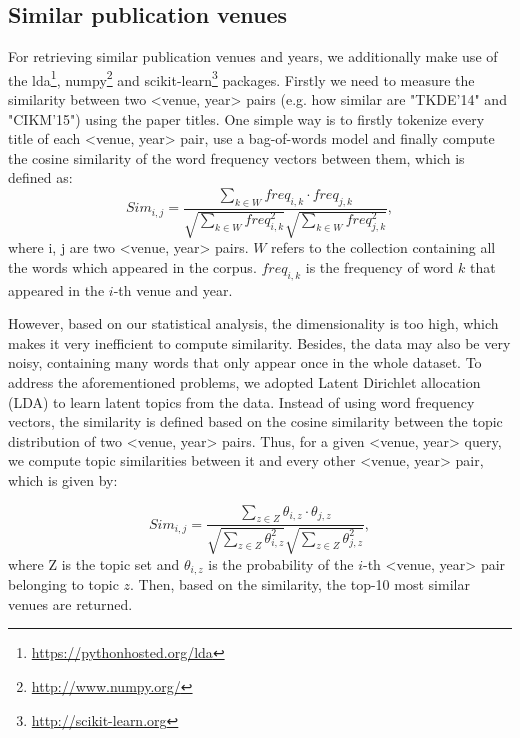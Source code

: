 \documentclass{sig-alternate-05-2015}
\begin{document}
\subsection{Similar publication venues}
For retrieving similar publication venues and years, we additionally make use of the lda\footnote{\url{https://pythonhosted.org/lda}}, numpy\footnote{\url{http://www.numpy.org/}} and scikit-learn\footnote{\url{http://scikit-learn.org}} packages. Firstly we need to measure the similarity between two <venue, year> pairs (e.g. how similar are "TKDE'14" and "CIKM'15") using the paper titles. One simple way is to firstly tokenize every title of each <venue, year> pair, use a bag-of-words model and finally compute the cosine similarity of the word frequency vectors between them, which is defined as:
\begin{equation*}
  Sim_{i, j} = \frac{\sum_{k\in W}freq_{i,k} \cdot freq_{j,k}}{\sqrt{\sum_{k\in W}freq_{i,k}^2}\sqrt{\sum_{k\in W}freq_{j,k}^2}},
\end{equation*}
where i, j are two <venue, year> pairs. $W$ refers to the collection containing all the words which appeared in the corpus. $freq_{i,k}$ is the frequency of word $k$ that appeared in the $i$-th venue and year.

However, based on our statistical analysis, the dimensionality is too high, which makes it very inefficient to compute similarity. Besides, the data may also be very noisy, containing many words that only appear once in the whole dataset. To address the aforementioned problems, we adopted Latent Dirichlet allocation (LDA)\cite{blei2003latent} to learn latent topics from the data. Instead of using word frequency vectors, the similarity is defined based on the cosine similarity between the topic distribution of two <venue, year> pairs. Thus, for a given <venue, year> query, we compute topic similarities between it and every other <venue, year> pair, which is given by:

\begin{equation*}
  Sim_{i, j} = \frac{\sum_{z\in Z}\theta_{i,z} \cdot \theta_{j,z}}{\sqrt{\sum_{z\in Z}\theta_{i,z}^2}\sqrt{\sum_{z\in Z}\theta_{j,z}^2}},
\end{equation*}
where Z is the topic set and $\theta_{i,z}$ is the probability of the $i$-th <venue, year> pair belonging to topic $z$. Then, based on the similarity, the top-10 most similar venues are returned.

\end{document}
